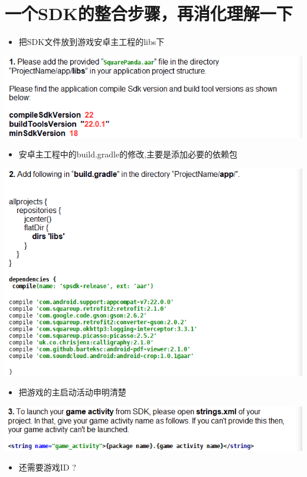 \documentclass[9pt, b5paper]{article}
\begin{document}
\section{一个SDK的整合步骤，再消化理解一下}
\label{sec-6}
\begin{itemize}
\item 把SDK文件放到游戏安卓主工程的libs下
\end{itemize}

\includegraphics[width=.9\linewidth]{./pic/notes_20221220_153025.png}
\begin{itemize}
\item 安卓主工程中的build.gradle的修改,主要是添加必要的依赖包
\end{itemize}

\includegraphics[width=.9\linewidth]{./pic/notes_20221220_153107.png}
\begin{itemize}
\item 把游戏的主启动活动申明清楚
\end{itemize}

\includegraphics[width=.9\linewidth]{./pic/notes_20221220_153212.png}
\begin{itemize}
\item 还需要游戏ID ?
\end{itemize}
\end{document}

